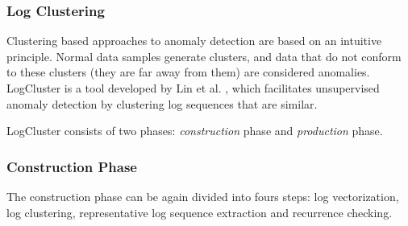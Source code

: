 \subsubsection{Log Clustering}
 \label{section:lrLogClustering}

Clustering based approaches to anomaly detection are based on an intuitive principle. Normal data samples generate clusters, and data that do not conform to these clusters (they are far away from them) are considered anomalies. LogCluster is a tool developed by Lin et al. \cite{logCluster2016}, which facilitates unsupervised anomaly detection by clustering log sequences that are similar. 

LogCluster consists of two phases: \textit{construction} phase and \textit{production} phase. 

\subsubsection*{Construction Phase}
The construction phase can be again divided into fours steps: log vectorization, log clustering, representative log sequence extraction and recurrence checking.

